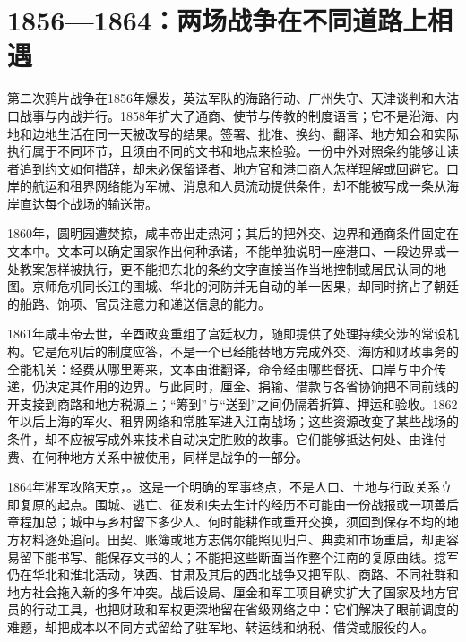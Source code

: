 \section{1856—1864：两场战争在不同道路上相遇}

第二次鸦片战争在1856年爆发，英法军队的海路行动、广州失守、天津谈判和大沽口战事与内战并行。1858年扩大了通商、使节与传教的制度语言；它不是沿海、内地和边地生活在同一天被改写的结果。签署、批准、换约、翻译、地方知会和实际执行属于不同环节，且须由不同的文书和地点来检验。一份中外对照条约能够让读者追到约文如何措辞，却未必保留译者、地方官和港口商人怎样理解或回避它。口岸的航运和租界网络能为军械、消息和人员流动提供条件，却不能被写成一条从海岸直达每个战场的输送带。

1860年，圆明园遭焚掠，咸丰帝出走热河；其后的把外交、边界和通商条件固定在文本中。文本可以确定国家作出何种承诺，不能单独说明一座港口、一段边界或一处教案怎样被执行，更不能把东北的条约文字直接当作当地控制或居民认同的地图。京师危机同长江的围城、华北的河防并无自动的单一因果，却同时挤占了朝廷的船路、饷项、官员注意力和递送信息的能力。

1861年咸丰帝去世，辛酉政变重组了宫廷权力，随即提供了处理持续交涉的常设机构。它是危机后的制度应答，不是一个已经能替地方完成外交、海防和财政事务的全能机关：经费从哪里筹来，文本由谁翻译，命令经由哪些督抚、口岸与中介传递，仍决定其作用的边界。与此同时，厘金、捐输、借款与各省协饷把不同前线的开支接到商路和地方税源上；“筹到”与“送到”之间仍隔着折算、押运和验收。1862年以后上海的军火、租界网络和常胜军进入江南战场；这些资源改变了某些战场的条件，却不应被写成外来技术自动决定胜败的故事。它们能够抵达何处、由谁付费、在何种地方关系中被使用，同样是战争的一部分。

1864年湘军攻陷天京，。这是一个明确的军事终点，不是人口、土地与行政关系立即复原的起点。围城、逃亡、征发和失去生计的经历不可能由一份战报或一项善后章程加总；城中与乡村留下多少人、何时能耕作或重开交换，须回到保存不均的地方材料逐处追问。田契、账簿或地方志偶尔能照见归户、典卖和市场重启，却更容易留下能书写、能保存文书的人；不能把这些断面当作整个江南的复原曲线。捻军仍在华北和淮北活动，陕西、甘肃及其后的西北战争又把军队、商路、不同社群和地方社会拖入新的多年冲突。战后设局、厘金和军工项目确实扩大了国家及地方官员的行动工具，也把财政和军权更深地留在省级网络之中：它们解决了眼前调度的难题，却把成本以不同方式留给了驻军地、转运线和纳税、借贷或服役的人。

